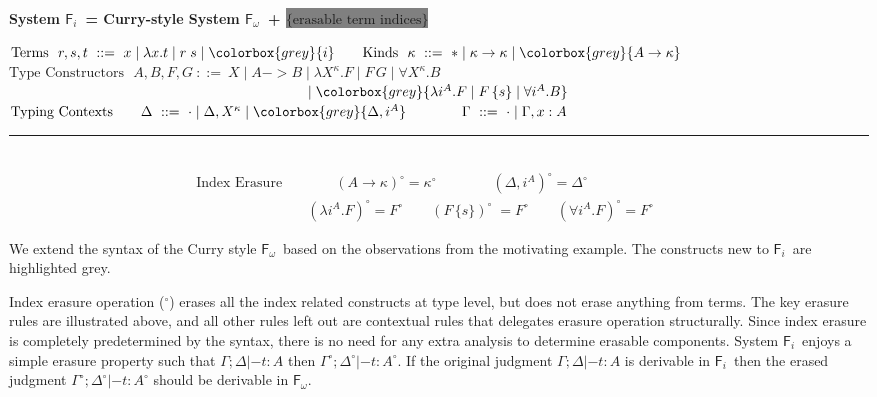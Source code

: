 \documentclass{article}
\newcommand{\Fi}{\ensuremath{\mathsf{F}_i}}
\newcommand{\Fw}{\ensuremath{\mathsf{F}_\omega}}
\newcommand{\newFi}[1]{\colorbox{grey}{\ensuremath{#1}}}
\begin{document}
\begin{center}
\textbf{
 System \Fi ~= Curry-style System \Fw\ + \newFi{\text{\{erasable term indices\}}}}
 \vspace*{-7pt}
\end{center}
\begin{framed}\vspace{-6pt}\noindent
$
\text{Terms}~~ r,s,t ~ ::= ~ x \mid \lambda x.t \mid r\;s \mid \newFi{i}
\qquad
\text{Kinds}~~ \kappa ~ ::= ~ *
                                \mid \kappa -> \kappa
                                \mid \newFi{A -> \kappa}$ \vspace*{2pt} \\
$
\text{Type Constructors}~~~
        A,B,F,G               ~ ::= ~ X
                                \mid A -> B
                                \mid \lambda X^\kappa.F
                                \mid F\,G
                                \mid \forall X^\kappa . B$\\
$~\qquad\qquad\qquad\qquad\qquad\qquad\qquad\qquad\qquad\qquad\quad
\mid \newFi{\lambda i^A.F
                                \mid F\,\{s\}
                                \mid \forall i^A . B}$ \\
$\text{Typing Contexts}
\qquad \Delta                ~ ::= ~ \cdot
                                \mid \Delta, X^\kappa
                                \mid \newFi{\Delta, i^A}
\qquad\qquad \Gamma                ~ ::= ~ \cdot
                                \mid \Gamma, x : A 
$\vspace*{3pt}
\hrule ~ \\ \vspace*{-20pt}
\begin{align*}
 \!\!\!\!\!\!\!\!\text{Index Erasure}\quad
& \qquad (A\to\kappa)^{\circ}=\kappa^{\circ} \qquad \qquad
(\Delta,i^A)^\circ = \Delta^\circ
\\
& (\lambda i^{A}.F)^{\circ}=F^{\circ} \qquad
(F\,\{s\})^{\circ}\;=F^{\circ} \qquad
(\forall i^{A}.F)^{\circ}=F^{\circ} \qquad
\end{align*}\vspace*{-25pt}
\end{framed}\vspace*{-5pt}
We extend the syntax of the Curry style \Fw\ based on the observations from
the motivating example. The constructs new to \Fi\ are highlighted grey.

Index erasure operation ($^\circ$) erases all the index related constructs
at type level, but does not erase anything from terms. The key erasure rules are
illustrated above, and all other rules left out are contextual rules that
delegates erasure operation structurally. Since index erasure is completely
predetermined by the syntax, there is no need for any extra analysis
to determine erasable components. System \Fi\ enjoys a simple erasure property
such that $\Gamma;\Delta|- t:A$ then $\Gamma^\circ;\Delta^\circ|- t:A^\circ$.
If the original judgment $\Gamma;\Delta|- t:A$ is derivable in \Fi\
then the erased judgment $\Gamma^\circ;\Delta^\circ|- t:A^\circ$ should be
derivable in \Fw.
\end{document}
